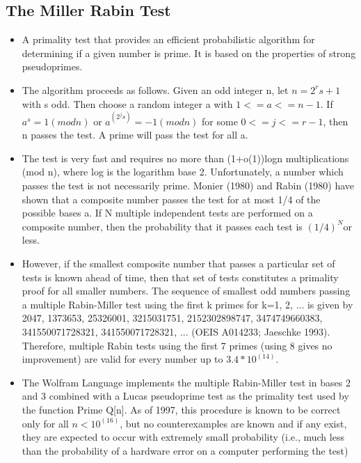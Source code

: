 \documentclass[a4paper,12pt]{article}
\begin{document}
	\subsection{The Miller Rabin Test}
	\begin{itemize}
	    \item	A primality test that provides an efficient probabilistic algorithm for determining if a given number is prime. It is based on the properties of strong pseudoprimes.

        \item The algorithm proceeds as follows. Given an odd integer n, let $n=2^{r}s+1$ with s odd. Then choose a random integer a with $1<=a<=n-1$. If $a^{s}=1 (mod n)$ or $a^{(2^{j}s)}=-1 (mod n)$ for some $0<=j<=r-1$, then n passes the test. A prime will pass the test for all a.

\item The test is very fast and requires no more than (1+o(1))logn multiplications (mod n), where log is the logarithm base 2. Unfortunately, a number which passes the test is not necessarily prime. Monier (1980) and Rabin (1980) have shown that a composite number passes the test for at most 1/4 of the possible bases a. If N multiple independent tests are performed on a composite number, then the probability that it passes each test is $(1/4)^{N}$or less.
\item 
However, if the smallest composite number that passes a particular set of tests is known ahead of time, then that set of tests constitutes a primality proof for all smaller numbers. The sequence of smallest odd numbers passing a multiple Rabin-Miller test using the first k primes for k=1, 2, ... is given by 2047, 1373653, 25326001, 3215031751, 2152302898747, 3474749660383, 341550071728321, 341550071728321, ... (OEIS A014233; Jaeschke 1993). Therefore, multiple Rabin tests using the first 7 primes (using 8 gives no improvement) are valid for every number up to $3.4*10^{(14)}$.
\item 
The Wolfram Language implements the multiple Rabin-Miller test in bases 2 and 3 combined with a Lucas pseudoprime test as the primality test used by the function Prime Q[n]. As of 1997, this procedure is known to be correct only for all $n<10^{(16)}$, but no counterexamples are known and if any exist, they are expected to occur with extremely small probability (i.e., much less than the probability of a hardware error on a computer performing the test)

	\end{itemize}	
\end{document}
